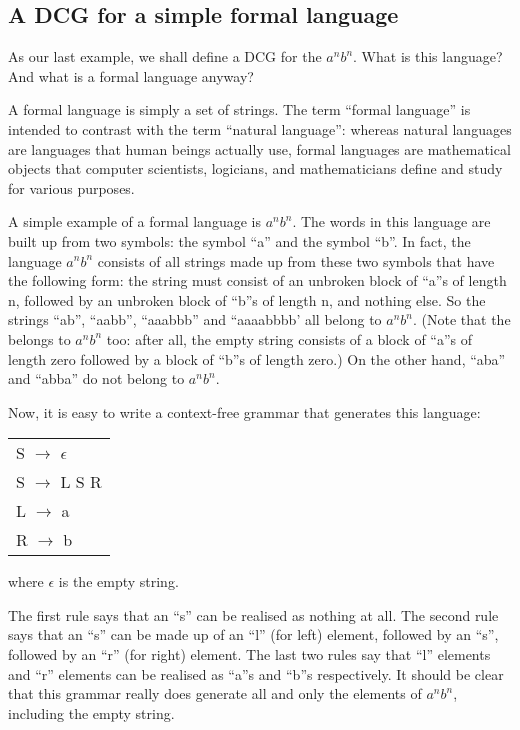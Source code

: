 \subsection*{A DCG for a simple formal language}\label{SUBSEC.L7.ANBN}

As our last example, we shall define a DCG for the  $a^nb^n$. What is this language? And what is a formal
language anyway?

 A formal language is simply a set of strings. The term ``formal
language'' is intended to contrast with the term ``natural language'':
whereas natural languages are languages that human beings actually
use, formal languages are mathematical objects that computer
scientists, logicians, and mathematicians define and study for various
purposes.

A simple example of a formal language is $a^nb^n$.  The words in this
language are built up from two symbols: the symbol ``a'' and the
symbol ``b''.  In fact, the language $a^nb^n$ consists of all
strings made up from these two symbols that have the following form:
the string must consist of an unbroken block of ``a''s of length
n, followed by an unbroken block of ``b''s of length
n, and nothing else.  So the strings ``ab'', ``aabb'', ``aaabbb'' and ``aaaabbbb' all belong to
$a^nb^n$. (Note that the  belongs to $a^nb^n$
too: after all, the empty string consists of a block of ``a''s
of length zero followed by a block of ``b''s of length zero.)
On the other hand, ``aba'' and ``abba'' do not belong to
$a^nb^n$.

Now, it is easy to write a context-free grammar that generates this
language:

\begin{center}\begin{tabular}{l}
S $\rightarrow$ $\epsilon$\\
S $\rightarrow$ L S R\\
L $\rightarrow$ a \\
R $\rightarrow$ b
\end{tabular}\end{center}

where $\epsilon$ is the empty string.

The first rule says that an ``s'' can be realised as nothing at
all.  The second rule says that an ``s'' can be made up of an
``l'' (for left) element, followed by an ``s'', followed
by an ``r'' (for right) element. The last two rules say that
``l'' elements and ``r'' elements can be realised as
``a''s and ``b''s respectively. It should be clear that
this grammar really does generate all and only the elements of
$a^nb^n$, including the empty string.

